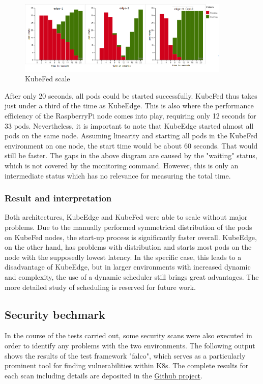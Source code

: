 \documentclass[MSC,Master,english]{twbook}%
\begin{document}
\begin{center}
    \begin{figure}[ht]
        \centering
        \includegraphics[width=0.9\textwidth]{PICs/kubefed-scale-100.png}
        \caption{KubeFed scale}
        \label{fig:kubefed-scale}
    \end{figure}
\end{center}
\par
After only 20 seconds, all pods could be started successfully. KubeFed thus takes just under a third of the time as KubeEdge. This is also where the performance efficiency of the RaspberryPi node comes into play, requiring only 12 seconds for 33 pods. Nevertheless, it is important to note that KubeEdge started almost all pods on the same node. Assuming linearity and starting all pods in the KubeFed environment on one node, the start time would be about 60 seconds. That would still be faster. The gaps in the above diagram are caused by the "waiting" status, which is not covered by the monitoring command. However, this is only an intermediate status which has no relevance for measuring the total time.

\subsubsection{Result and interpretation} 
Both architectures, KubeEdge and KubeFed were able to scale without major problems. Due to the manually performed symmetrical distribution of the pods on KubeFed nodes, the start-up process is significantly faster overall. KubeEdge, on the other hand, has problems with distribution and starts most pods on the node with the supposedly lowest latency. In the specific case, this leads to a disadvantage of KubeEdge, but in larger environments with increased dynamic and complexity, the use of a dynamic scheduler still brings great advantages. The more detailed study of scheduling is reserved for future work.

\subsection{Security bechmark}
In the course of the tests carried out, some security scans were also executed in order to identify any problems with the two environments. The following output shows the results of the test framework "falco"\cite{falco-scan}, which serves as a particularly prominent tool for finding vulnerabilities within \ac{K8s}. The complete results for each scan including details are deposited in the \hyperref{https://github.com/Berndinox/K8sEdge/tree/main/Tests/it-security}{}{}{Github project}\cite{gh-bk-ke-bench}\cite{gh-bk-kf-bench}.
\end{document}
